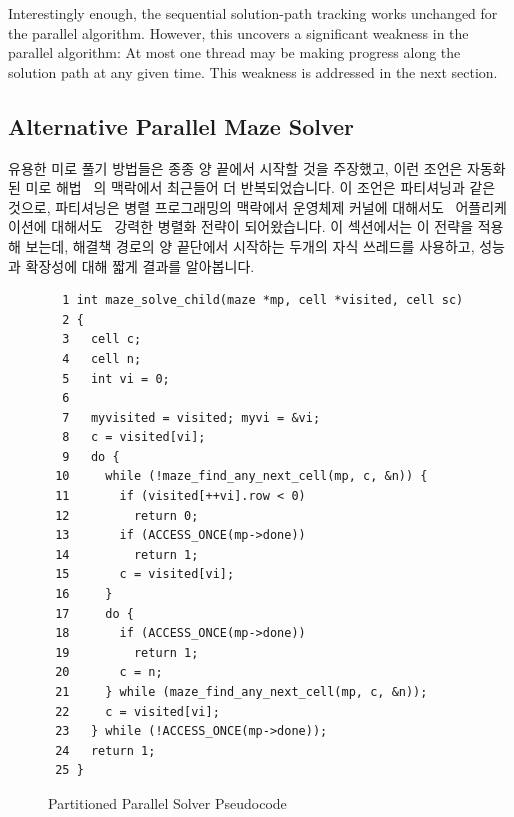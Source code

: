 Interestingly enough, the sequential solution-path tracking works unchanged
for the parallel algorithm.
However, this uncovers a significant weakness in the parallel algorithm:
At most one thread may be making progress along the solution path at
any given time.
This weakness is addressed in the next section.
\fi

\subsection{Alternative Parallel Maze Solver}
\label{sec:SMPdesign:Alternative Parallel Maze Solver}

유용한 미로 풀기 방법들은 종종 양 끝에서 시작할 것을 주장했고, 이런 조언은
자동화된 미로 해법~\cite{UMD:CMSC433maze} 의 맥락에서 최근들어 더
반복되었습니다.
이 조언은 파티셔닝과 같은 것으로, 파티셔닝은 병렬 프로그래밍의 맥락에서
운영체제 커널에 대해서도~\cite{Beck85,Inman85} 어플리케이션에
대해서도~\cite{DavidAPatterson2010TroubleMulticore} 강력한 병렬화 전략이
되어왔습니다.
이 섹션에서는 이 전략을 적용해 보는데, 해결책 경로의 양 끝단에서 시작하는
두개의 자식 쓰레드를 사용하고, 성능과 확장성에 대해 짧게 결과를 알아봅니다.

\begin{figure}[tbp]
{ \scriptsize
\begin{verbatim}
  1 int maze_solve_child(maze *mp, cell *visited, cell sc)
  2 {
  3   cell c;
  4   cell n;
  5   int vi = 0;
  6 
  7   myvisited = visited; myvi = &vi;
  8   c = visited[vi];
  9   do {
 10     while (!maze_find_any_next_cell(mp, c, &n)) {
 11       if (visited[++vi].row < 0)
 12         return 0;
 13       if (ACCESS_ONCE(mp->done))
 14         return 1;
 15       c = visited[vi];
 16     }
 17     do {
 18       if (ACCESS_ONCE(mp->done))
 19         return 1;
 20       c = n;
 21     } while (maze_find_any_next_cell(mp, c, &n));
 22     c = visited[vi];
 23   } while (!ACCESS_ONCE(mp->done));
 24   return 1;
 25 }
\end{verbatim}
}
\caption{Partitioned Parallel Solver Pseudocode}
\label{fig:SMPdesign:Partitioned Parallel Solver Pseudocode}
\end{figure}


